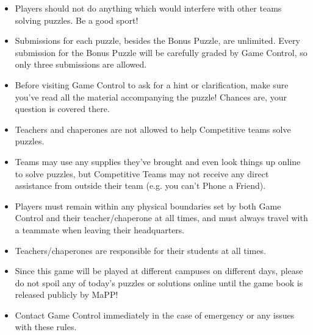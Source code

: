 \begin{itemize}
\item Players should not do anything which
would interfere with other teams solving puzzles. Be a good sport!
\item Submissions for each puzzle, besides the Bonus Puzzle, are unlimited.
Every submission for the Bonus Puzzle will be carefully graded by Game Control,
so only three submissions are allowed.
\item Before visiting Game Control to ask for a hint or clarification, make
sure you've read all the material accompanying the puzzle! Chances are,
your question is covered there.
\item Teachers and chaperones are not allowed to help Competitive teams solve
puzzles.
\item Teams may use any supplies they've brought and even
look things up online to solve puzzles, but Competitive Teams may not receive any direct
assistance from outside their team (e.g. you can't Phone a Friend).
\item Players must remain within any physical boundaries set by both
Game Control and their teacher/chaperone at all times, and must always
travel with a teammate when leaving their headquarters.
\item Teachers/chaperones are responsible for their students at
all times.
\item Since this game will be played at different campuses on different
days, please do not spoil any of today's puzzles or solutions online until
the game book is released publicly by MaPP!
\item Contact Game Control immediately in the case of emergency
or any issues with these rules.
\end{itemize}

